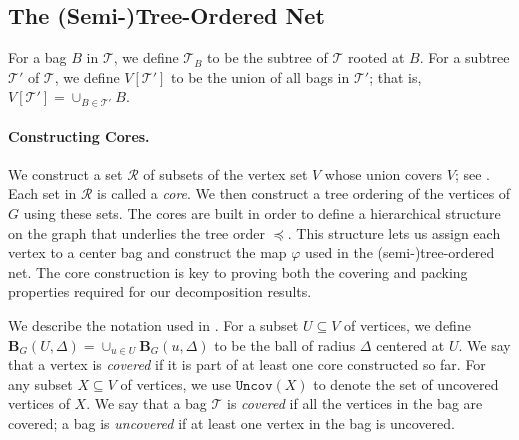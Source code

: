 \documentclass{theoretics}
\newcommand{\mt}{\mathcal{T}}
\def\coreSet{\mathcal{R}}
\def\uncovset{\mathtt{Uncov}}
\def\ball{\mathbf{B}}
\begin{document}
\subsection{The (Semi-)Tree-Ordered Net}\label{subsec:semi-tree-ordered}

 For a bag $B$ in $\mathcal{T}$, we define $\mt_B$ to be the subtree of $\mt$ rooted at $B$. For a subtree $\mt'$ of $\mathcal{T}$, we define $V[\mt']$ to be the union of all bags in $\mt'$; that is, $ V[\mt'] = \cup_{B\in \mt'}B$. 

\medskip
\hypertarget{alg:vertexOrdering}{\paragraph*{Constructing Cores.~}} We construct a set $\coreSet$ of subsets of the vertex set $V$ whose union covers $V$; see .  Each set in $\coreSet$ is called a \emph{core}. We then construct a tree ordering of the vertices of $G$ using these sets. The cores are built in order to define a hierarchical structure on the graph that underlies the tree order $\preceq$. This structure lets us assign each vertex to a center bag and construct the map $\varphi$ used in the (semi-)tree-ordered net. The core construction is key to proving both the covering and packing properties required for our decomposition results.

We describe the notation used in .  For a subset $U\subseteq V$ of vertices, we define $\ball_G(U,\Delta) = \cup_{u\in U}\ball_G(u,\Delta)$ to be the ball of radius $\Delta$ centered at $U$. We say that a vertex is \emph{covered} if it is part of at least one core constructed so far. For any subset  $X\subseteq V$ of vertices, we use $\uncovset(X)$ to denote the set of uncovered vertices of $X$.  We say that a bag $\mathcal{T}$ is \emph{covered} if all the vertices in the bag are covered;  a bag is \emph{uncovered} if at least one vertex in the bag is uncovered.
\end{document}
